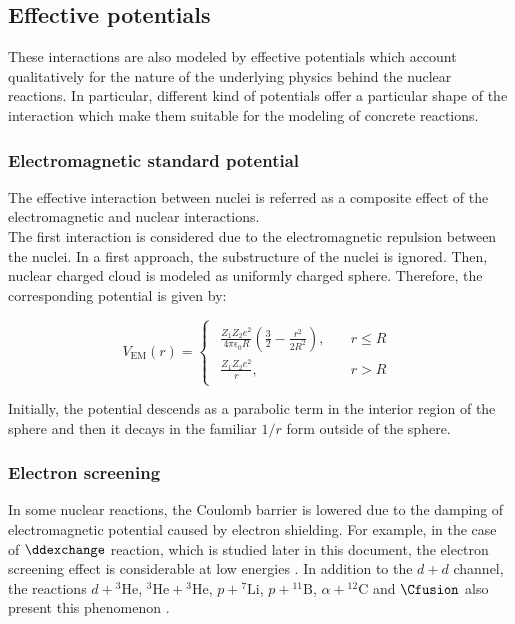 \documentclass[openany]{book}
\begin{document}
\subsection{Effective potentials} \label{sub:potential_effective}

These interactions are also modeled by effective potentials which account qualitatively for the nature of the underlying physics behind the nuclear reactions. In particular, different kind of potentials offer a particular shape of the interaction which make them suitable for the modeling of concrete reactions.

\subsubsection{Electromagnetic standard potential} \label{sub:potential_effective_EM}

The effective interaction between nuclei is referred as a composite effect of the electromagnetic and nuclear interactions.  \\

The first interaction is considered due to the electromagnetic repulsion between the nuclei. In a first approach, the  substructure of the nuclei is ignored. Then, nuclear charged cloud is modeled as uniformly charged sphere. Therefore, the corresponding potential is given by:

\begin{equation} \label{eq:potential_EM}
	V_{\mathrm{EM}}(r) = 	\left\{\begin{array}{l}
		\begin{split}
			\frac{Z_1Z_2e^2}{4\pi\epsilon_0R}\left(\frac{3}{2} - \frac{r^2}{2R^2}\right), \quad &r \le R \\ 
			\frac{Z_1Z_2e^2}{r}, \quad &r > R	
		\end{split}
	\end{array}\right.
\end{equation}

Initially, the potential descends as a parabolic term in the interior region of the sphere and then it decays in the familiar $1/r$ form outside of the sphere. 


\subsubsection{Electron screening}\label{ssub:empirical_screening}

In some nuclear reactions, the Coulomb barrier is lowered due to the damping of electromagnetic potential caused by electron shielding. For example, in the case of $\ddexchange$ reaction, which is studied later in this document, the electron screening effect is considerable at low energies \cite{raiola_migliardi_gyurky_aliotta_formicola_bonetti_broggini_campajola_corvisiero_costantini_et_2002}. In addition to the $d +d$ channel, the reactions  $d+\mathrm{{}^{3}He}$, $\mathrm{{}^{3}He}+\mathrm{{}^{3}He}$, $p+\mathrm{{}^{7}Li}$, $p+\mathrm{{}^{11}B}$, $\alpha+\mathrm{{}^{12}C}$ and $\Cfusion$ also present this phenomenon \cite{assenbaum_langanke_rolfs_1987}. \\
\end{document}

